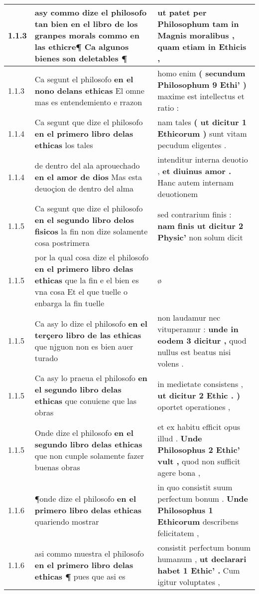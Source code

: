 \begin{tabular}{|p{1cm}|p{6.5cm}|p{6.5cm}|}
1.1.3 & asy commo dize el philosofo tan bien \textbf{ en el libro de los granpes morals } commo en las ethicre¶ Ca algunos bienes son deletables ¶ & ut patet per Philosophum \textbf{ tam in Magnis moralibus , } quam etiam in Ethicis , \\\hline
1.1.3 & Ca segunt el philosofo \textbf{ en el nono delans ethicas } El omne mas es entendemiento e rrazon & homo enim \textbf{ ( secundum Philosophum 9 Ethi’ ) } maxime est intellectus et ratio : \\\hline
1.1.4 & Ca segunt que dize el philosofo \textbf{ en el primero libro delas ethicas } los tales & nam tales \textbf{ ( ut dicitur 1 Ethicorum ) } sunt vitam pecudum eligentes . \\\hline
1.1.4 & de dentro del ala aprouechado \textbf{ en el amor de dios } Mas esta deuoçion de dentro del alma & intenditur interna deuotio , \textbf{ et diuinus amor . } Hanc autem internam deuotionem \\\hline
1.1.5 & Ca segunt que dize el philosofo \textbf{ en el segundo libro delos fisicos } la fin non dize solamente cosa postrimera & sed contrarium finis : \textbf{ nam finis ut dicitur 2 Physic’ } non solum dicit \\\hline
1.1.5 & por la qual cosa dize el philosofo \textbf{ en el primero libro delas ethicas } que la fin e el bien es vna cosa Et el que tuelle o enbarga la fin tuelle & ø \\\hline
1.1.5 & Ca asy lo dize el philosofo \textbf{ en el terçero libro de las ethicas } que njguon non es bien auer turado & non laudamur nec vituperamur : \textbf{ unde in eodem 3 dicitur , } quod nullus est beatus nisi volens . \\\hline
1.1.5 & Ca asy lo praeua el philosofo \textbf{ en el segundo libro delas ethicas } que conuiene que las obras & in medietate consistens , \textbf{ ut dicitur 2 Ethic . ) } oportet operationes , \\\hline
1.1.5 & Onde dize el philosofo \textbf{ en el segundo libro delas ethicas } que non cunple solamente fazer buenas obras & et ex habitu efficit opus illud . \textbf{ Unde Philosophus 2 Ethic’ vult , } quod non sufficit agere bona , \\\hline
1.1.6 & ¶onde dize el philosofo \textbf{ en el primero libro delas ethicas } quariendo mostrar & in quo consistit suum perfectum bonum . \textbf{ Unde Philosophus 1 Ethicorum } describens felicitatem , \\\hline
1.1.6 & asi commo muestra el philosofo \textbf{ en el primero libro delas ethicas ¶ } pues que asi es & consistit perfectum bonum humanum , \textbf{ ut declarari habet 1 Ethic’ . } Cum igitur voluptates , \\\hline

\end{tabular}
